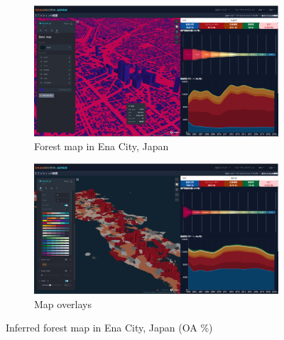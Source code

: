 \begin{figure}[tbh!]
  \centering
  \begin{subfigure}{.5\textwidth}
      \centering
      \includegraphics[width=.9\textwidth]{figs/chap7/3d_bldg.png}
      \caption{Forest map in Ena City, Japan}
  \end{subfigure}%
  \begin{subfigure}{.5\textwidth}
      \centering
      \includegraphics[width=.9\textwidth]{figs/chap7/3d_ja.png}
      \caption{Map overlays}
  \end{subfigure}
  \caption[Inferred forest map in Ena City]{Inferred forest map in Ena City, Japan  (OA \%)}
  \label{fig:chap7_fig3}
\end{figure}

